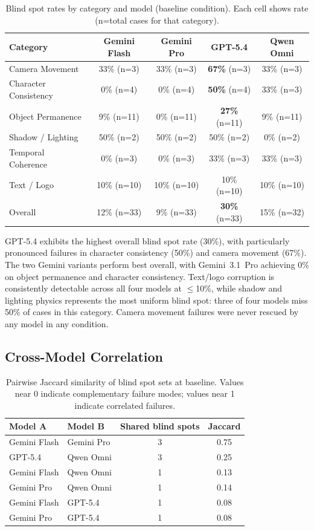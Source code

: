 \documentclass[11pt]{article}
\begin{document}
\begin{table}[h]
\centering
\caption{Blind spot rates by category and model (baseline condition). Each cell shows rate (n=total cases for that category).}
\label{tab:blindspot}
\small
\begin{tabular}{lcccc}
\toprule
Category & Gemini Flash & Gemini Pro & GPT-5.4 & Qwen Omni \\
\midrule
Camera Movement & 33\% (n=3) & 33\% (n=3) & \textbf{67\%} (n=3) & 33\% (n=3) \\
Character Consistency & 0\% (n=4) & 0\% (n=4) & \textbf{50\%} (n=4) & 33\% (n=3) \\
Object Permanence & 9\% (n=11) & 0\% (n=11) & \textbf{27\%} (n=11) & 9\% (n=11) \\
Shadow / Lighting & 50\% (n=2) & 50\% (n=2) & 50\% (n=2) & 0\% (n=2) \\
Temporal Coherence & 0\% (n=3) & 0\% (n=3) & 33\% (n=3) & 33\% (n=3) \\
Text / Logo & 10\% (n=10) & 10\% (n=10) & 10\% (n=10) & 10\% (n=10) \\
\midrule
Overall & 12\% (n=33) & 9\% (n=33) & \textbf{30\%} (n=33) & 15\% (n=32) \\
\bottomrule
\end{tabular}
\end{table}

GPT-5.4 exhibits the highest overall blind spot rate (30\%), with particularly pronounced failures in character consistency (50\%) and camera movement (67\%). The two Gemini variants perform best overall, with Gemini~3.1~Pro achieving 0\% on object permanence and character consistency. Text/logo corruption is consistently detectable across all four models at $\leq$10\%, while shadow and lighting physics represents the most uniform blind spot: three of four models miss 50\% of cases in this category. Camera movement failures were never rescued by any model in any condition.

\subsection{Cross-Model Correlation}

\begin{table}[h]
\centering
\caption{Pairwise Jaccard similarity of blind spot sets at baseline. Values near 0 indicate complementary failure modes; values near 1 indicate correlated failures.}
\label{tab:jaccard}
\begin{tabular}{llcc}
\toprule
Model A & Model B & Shared blind spots & Jaccard \\
\midrule
Gemini Flash & Gemini Pro & 3 & 0.75 \\
GPT-5.4 & Qwen Omni & 3 & 0.25 \\
Gemini Flash & Qwen Omni & 1 & 0.13 \\
Gemini Pro & Qwen Omni & 1 & 0.14 \\
Gemini Flash & GPT-5.4 & 1 & 0.08 \\
Gemini Pro & GPT-5.4 & 1 & 0.08 \\
\bottomrule
\end{tabular}
\end{table}
\end{document}

